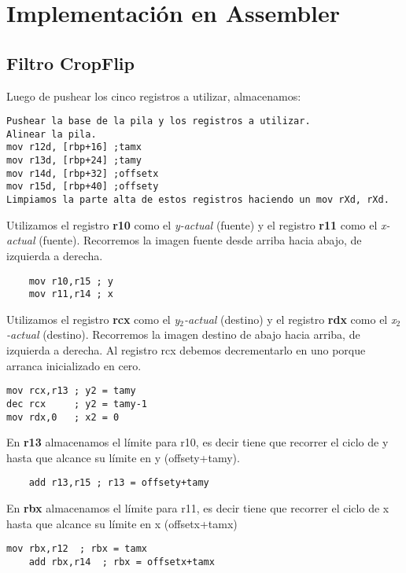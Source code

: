 \documentclass[a4paper]{article}
\begin{document}
\section{Implementaci\'on en Assembler}

\subsection{Filtro CropFlip}
\indent Luego de pushear los cinco registros a utilizar, almacenamos: \\
\begin{codesnippet}
\begin{verbatim}
Pushear la base de la pila y los registros a utilizar.
Alinear la pila.
mov r12d, [rbp+16] ;tamx
mov r13d, [rbp+24] ;tamy
mov r14d, [rbp+32] ;offsetx
mov r15d, [rbp+40] ;offsety
Limpiamos la parte alta de estos registros haciendo un mov rXd, rXd.
\end{verbatim}
\end{codesnippet}

 \indent Utilizamos el registro \textbf{r10} como el \emph{y-actual} (fuente) y el registro \textbf{r11} como el \emph{x-actual} (fuente). Recorremos la imagen fuente desde arriba hacia abajo, de izquierda a derecha.\\
 \begin{codesnippet}
\begin{verbatim}
	mov r10,r15 ; y
	mov r11,r14 ; x
\end{verbatim}
\end{codesnippet}
 \indent Utilizamos el registro \textbf{rcx} como el \emph{y$_2$-actual} (destino) y el registro \textbf{rdx} como el \emph{x$_2$-actual} (destino). Recorremos la imagen destino de abajo hacia arriba, de izquierda a derecha. Al registro rcx debemos decrementarlo en uno porque arranca inicializado en cero. \\
 \begin{codesnippet}
\begin{verbatim}
mov rcx,r13 ; y2 = tamy
dec rcx     ; y2 = tamy-1
mov rdx,0   ; x2 = 0
\end{verbatim}
\end{codesnippet}

\indent En \textbf{r13} almacenamos el l\'imite para r10, es decir tiene que recorrer el ciclo de y hasta que alcance su l\'imite en y (offsety+tamy). \\
	  \begin{codesnippet}
\begin{verbatim}
	add r13,r15 ; r13 = offsety+tamy
\end{verbatim}
\end{codesnippet}
\indent En \textbf{rbx} almacenamos el l\'imite para r11, es decir tiene que recorrer el ciclo de x hasta que alcance su l\'imite en x (offsetx+tamx)\\
	  \begin{codesnippet}
\begin{verbatim}
mov rbx,r12  ; rbx = tamx
	add rbx,r14  ; rbx = offsetx+tamx
\end{verbatim}
\end{codesnippet}
\end{document}
